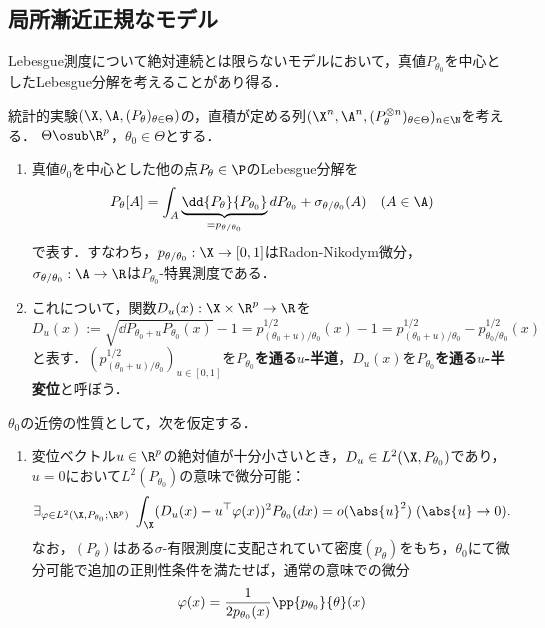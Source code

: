 \documentclass[uplatex,dvipdfmx]{jsreport}
\begin{document}
\subsection{局所漸近正規なモデル}

\begin{tcolorbox}[colframe=ForestGreen, colback=ForestGreen!10!white,breakable,colbacktitle=ForestGreen!40!white,coltitle=black,fonttitle=\bfseries\sffamily,
title=]
    Lebesgue測度について絶対連続とは限らないモデルにおいて，真値$P_{\theta_0}$を中心としたLebesgue分解を考えることがあり得る．

\end{tcolorbox}

\begin{model}[局所漸近正規なモデル]\label{model-lan}
    統計的実験$(\X,\A,(P_\theta)_{\theta\in\Theta})$の，直積が定める列$(\X^n,\A^n,(P_\theta^{\otimes n})_{\theta\in\Theta})_{n\in\N}$を考える．
    $\Theta\osub\R^p$，$\theta_0\in\Theta$とする．
    \begin{enumerate}
        \item 真値$\theta_0$を中心とした他の点$P_\theta\in\P$のLebesgue分解を
        \[P_\theta[A]=\int_A\underbrace{\dd{P_\theta}{P_{\theta_0}}}_{=p_{\theta/\theta_0}}dP_{\theta_0}+\sigma_{\theta/\theta_0}(A)\quad(A\in\A)\]
        で表す．すなわち，$p_{\theta/\theta_0}:\X\to[0,1]$はRadon-Nikodym微分，$\sigma_{\theta/\theta_0}:\A\to\R$は$P_{\theta_0}$-特異測度である．
        \item これについて，関数$D_u(x):\X\times\R^p\to\R$を
        \[D_u(x):=\sqrt{\dd{P_{\theta_0+u}}{P_{\theta_0}}(x)}-1=p_{(\theta_0+u)/\theta_0}^{1/2}(x)-1=p^{1/2}_{(\theta_0+u)/\theta_0}-p^{1/2}_{\theta_0/\theta_0}(x)\]
        と表す．$(p^{1/2}_{(\theta_0+u)/\theta_0})_{u\in[0,1]}$を\textbf{$P_{\theta_0}$を通る$u$-半道}，$D_u(x)$を\textbf{$P_{\theta_0}$を通る$u$-半変位}と呼ぼう．
    \end{enumerate}
    $\theta_0$の近傍の性質として，次を仮定する．
    \begin{enumerate}[({G}1)]
        \item 変位ベクトル$u\in\R^p$の絶対値が十分小さいとき，$D_u\in L^2(\X,P_{\theta_0})$であり，$u=0$において$L^2(P_{\theta_0})$の意味で微分可能：
        \[\exists_{\varphi\in L^2(\X,P_{\theta_0};\R^p)}\;\int_\X(D_u(x)-u^{\top}\varphi(x))^2P_{\theta_0}(dx)=o(\abs{u}^2)\;(\abs{u}\to0).\]
        なお，$(P_\theta)$はある$\sigma$-有限測度に支配されていて密度$(p_\theta)$をもち，$\theta_0$にて微分可能で追加の正則性条件を満たせば，通常の意味での微分
        \[\varphi(x)=\frac{1}{2p_{\theta_0}(x)}\pp{p_{\theta_0}}{\theta}(x)\]

\end{enumerate}
\end{model}
\end{document}
